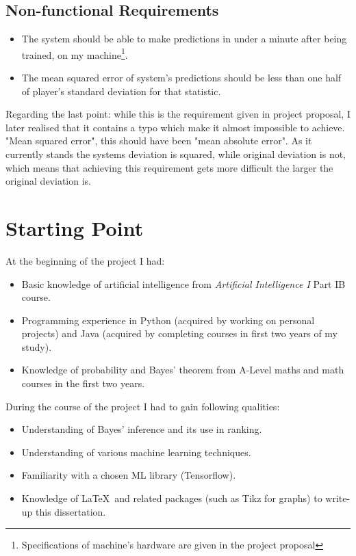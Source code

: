 \documentclass[12pt,a4paper]{book}
\begin{document}
\subsection{Non-functional Requirements}
\begin{itemize}
\item The system should be able to make predictions in under a minute after being trained, on my machine\footnote{Specifications of machine's hardware are given in the project proposal}.
\item The mean squared error of system's predictions should be less than one half of player's standard deviation for that statistic.
\end{itemize}
Regarding the last point: while this is the requirement given in project proposal, I later realised that it contains a typo which make it almost impossible to achieve.
"Mean squared error", this should have been "mean absolute error".
As it currently stands the systems deviation is squared, while original deviation is not, which means that achieving this requirement gets more difficult the larger the original deviation is.
\section{Starting Point}
\noindent
At the beginning of the project I had:
\begin{itemize}
\item Basic knowledge of artificial intelligence from \emph{Artificial Intelligence I} Part IB course.
\item Programming experience in Python (acquired by working on personal projects) and Java (acquired by completing courses in first two years of my study).
\item Knowledge of probability and Bayes' theorem from A-Level maths and math courses in the first two years.
\end{itemize}
During the course of the project I had to gain following qualities:
\begin{itemize}
\item Understanding of Bayes' inference and its use in ranking.
\item Understanding of various machine learning techniques.
\item Familiarity with a chosen ML library (Tensorflow).
\item Knowledge of \LaTeX\ and related packages (such as Tikz for graphs) to write-up this dissertation.
\end{itemize}
\end{document}
